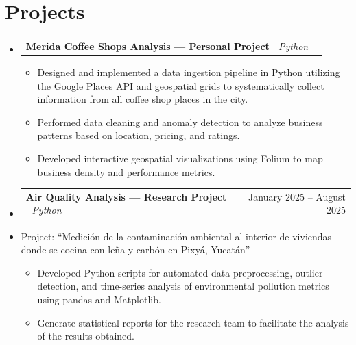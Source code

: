 \documentclass[letterpaper,11pt]{article}
\makeatletter
\newcommand{\resumeItem}[1]{
  \item\small{
    {#1 \vspace{-2pt}}
  }
}
\newcommand{\resumeProjectHeading}[2]{
    \item
    \begin{tabular*}{0.97\textwidth}{l@{\extracolsep{\fill}}r}
      \small#1 & #2 \\
    \end{tabular*}\vspace{-7pt}
}
\newcommand{\resumeSubHeadingListStart}{\begin{itemize}[leftmargin=0.15in, label={}]}
\newcommand{\resumeSubHeadingListEnd}{\end{itemize}}
\newcommand{\resumeItemListStart}{\begin{itemize}}
\newcommand{\resumeItemListEnd}{\end{itemize}\vspace{-5pt}}
\makeatother
\begin{document}
\section{Projects}
    \resumeSubHeadingListStart
      \resumeProjectHeading
          {\textbf{Merida Coffee Shops Analysis —  Personal Project} $|$ \emph{Python}}{}
          \resumeItemListStart
            \resumeItem{Designed and implemented a data ingestion pipeline in Python utilizing the Google Places API and geospatial grids to systematically collect information from all coffee shop places in the city.}
            \resumeItem{Performed data cleaning and anomaly detection to analyze business patterns based on location, pricing, and ratings.}
            \resumeItem{Developed interactive geospatial visualizations using Folium to map business density and performance metrics.}
          \resumeItemListEnd
      \resumeProjectHeading
          {\textbf{Air Quality Analysis — Research Project} $|$ \emph{Python}}{January 2025 -- August 2025}
          \resumeItem{Project: “Medición de la contaminación ambiental al interior de viviendas donde se cocina con leña y carbón en Pixyá, Yucatán”}
          \resumeItemListStart
            \resumeItem{Developed Python scripts for automated data preprocessing, outlier detection, and time-series analysis of environmental pollution metrics using pandas and Matplotlib.}
            \resumeItem{Generate statistical reports for the research team to facilitate the analysis of the results obtained.}
          \resumeItemListEnd
    \resumeSubHeadingListEnd



%
\end{document}
